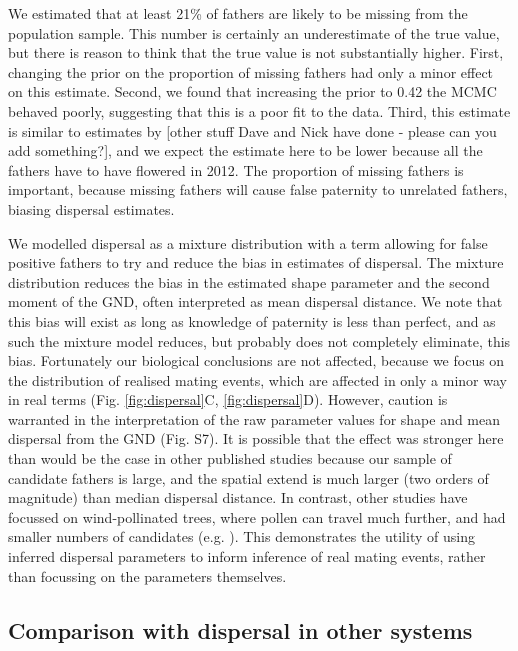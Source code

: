 \documentclass[10pt, a4paper, twocolumn]{article} %
\begin{document}
We estimated that at least 21\% of fathers are likely to be missing from the population sample.
This number is certainly an underestimate of the true value, but there is reason to think that the true value is not substantially higher.
First, changing the prior on the proportion of missing fathers had only a minor effect on this estimate.
Second, we found that increasing the prior to 0.42 the MCMC behaved poorly, suggesting that this is a poor fit to the data.
Third, this estimate is similar to estimates by [other stuff Dave and Nick have done - please can you add something?], and we expect the estimate here to be lower because all the fathers have to have flowered in 2012.
The proportion of missing fathers is important, because missing fathers will cause false paternity to unrelated fathers, biasing dispersal estimates.

We modelled dispersal as a mixture distribution with a term allowing for false positive fathers to try and reduce the bias in estimates of dispersal.
The mixture distribution reduces the bias in the estimated shape parameter and the second moment of the GND, often interpreted as mean dispersal distance.
We note that this bias will exist as long as knowledge of paternity is less than perfect, and as such the mixture model reduces, but probably does not completely eliminate, this bias. 
Fortunately our biological conclusions are not affected, because we focus on the distribution of realised mating events, which are affected in only a minor way in real terms (Fig. \ref{fig:dispersal}C, \ref{fig:dispersal}D).
However, caution is warranted in the interpretation of the raw parameter values for shape and mean dispersal from the GND (Fig. S7).
It is possible that the effect was stronger here than would be the case in other published studies because our sample of candidate fathers is large, and the spatial extend is much larger (two orders of magnitude) than median dispersal distance.
In contrast, other studies have focussed on wind-pollinated trees, where pollen can travel much further, and had smaller numbers of candidates (e.g. \cite{adams1992using, austerlitz2004using, klein2008pollen}).
This demonstrates the utility of using inferred dispersal parameters to inform inference of real mating events, rather than focussing on the parameters themselves.

\subsection{Comparison with dispersal in other systems}
\end{document}
